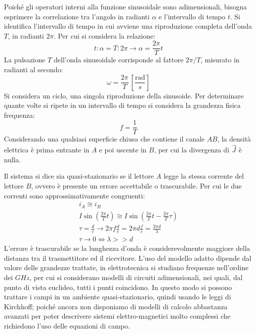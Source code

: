 \documentclass{article}
\numberwithin{equation}{subsection}
\begin{document}
Poiché gli operatori interni alla funzione sinusoidale sono adimensionali, bisogna esprimere la correlazione tra l'angolo in radianti $\alpha$ e l'intervallo di tempo $t$. 
Si identifica l'intervallo di tempo in cui avviene una riproduzione completa dell'onda $T$, in radianti $2\pi$. Per cui si considera la relazione:
\begin{equation*}
    t:\alpha=T:2\pi\to\displaystyle\alpha=\frac{2\pi}{T}t
\end{equation*}
La pulsazione $T$ dell'onda sinusoidale corrisponde al fattore ${2\pi}/T$, misurato in radianti al secondo:
\begin{equation*}
    \omega=\displaystyle\frac{2\pi}{T}\,\left[\frac{\mbox{rad}}{s}\right]
\end{equation*}
Si considera un ciclo, una singola riproduzione della sinusoide. Per determinare quante volte si ripete in un intervallo di tempo si considera la grandezza fisica frequenza:
\begin{equation*}
    f=\displaystyle\frac{1}{T}
\end{equation*}
Considerando una qualsiasi superficie chiusa che contiene il canale $AB$, la densità elettrica è prima entrante in $A$ e poi uscente in $B$, per cui la divergenza di $\vec J$ 
è nulla.


Il sistema si dice sia quasi-stazionario se il lettore $A$ legge la stessa corrente del lettore $B$, ovvero è presente un errore accettabile o trascurabile. 
Per cui le due correnti sono approssimativamente congruenti:
\begin{gather*}
    i_A\cong i_B\\
    I\sin\displaystyle\left(\frac{2\pi}{T}t\right)\cong I\sin\left(\frac{2\pi}{T}t-\frac{2\pi}{T}\tau\right)\\
    \tau=\displaystyle\frac{d}{c}\to \displaystyle 2\pi f\frac{d}{c}=2\pi d\frac{f}{c}=\frac{2\pi d}{\lambda}\\
    \tau\to 0\iff \lambda>>d
\end{gather*}
L'errore è trascurabile se la lunghezza d'onda è considerevolmente maggiore della distanza tra il trasmettitore ed il ricevitore. 
L'uso del modello adatto dipende dal valore delle grandezze trattate, in elettrotecnica si studiano frequenze nell'ordine dei $GHz$, per cui si considerano modelli di circuiti adimensionali, nei quali, dal punto di vista euclideo, tutti i punti coincidono. In questo modo si possono 
trattare i campi in un ambiente quasi-stazionario, quindi usando le leggi di Kirchhoff; poiché ancora non disponiamo di modelli di calcolo abbastanza avanzati per poter 
descrivere sistemi elettro-magnetici molto complessi che richiedono l'uso delle equazioni di campo. 
\end{document}
